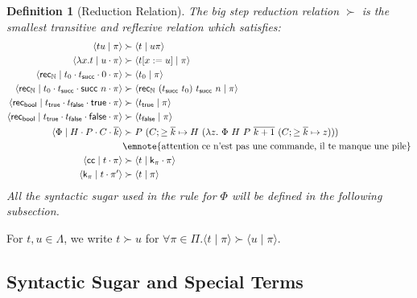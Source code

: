 \documentclass{article}
\newcommand{\successor}{\mathsf{succ}}
\newcommand{\recN}{\mathsf{rec}_{\mathbb{N}}}
\newcommand{\true}{\mathsf{true}}
\newcommand{\false}{\mathsf{false}}
\newcommand{\recbool}{\mathsf{rec_{bool}}}
\newcommand{\proc}[2]{\langle{#1}\mid{#2}\rangle}
\newcommand{\cc}{\mathsf{cc}}
\newcommand{\cont}{\mathsf{k}}
\newtheorem{definition}{Definition}
\begin{document}
\begin{definition}[Reduction Relation]
    The big step reduction relation $\succ$ is the smallest transitive and reflexive relation which satisfies:
    \begin{align*}
        \proc{t u}{\pi} & \succ \proc{t}{u\pi} \\
        \proc{\lambda x. t}{u\cdot \pi} & \succ \proc{t[x := u]}{\pi} \\
        \proc{\recN}{t_0 \cdot t_\successor \cdot 0 \cdot \pi} & \succ \proc{t_0}{\pi} \\
        \proc{\recN}{t_0 \cdot t_\successor \cdot \successor\ n \cdot \pi} & \succ \proc{\recN\ (t_\successor\ t_0)\ t_\successor\ n}{\pi} \\
        \proc{\recbool}{t_\true \cdot t_\false \cdot \true \cdot \pi} & \succ \proc{t_\true}{\pi} \\
        \proc{\recbool}{t_\true \cdot t_\false \cdot \false \cdot \pi} & \succ \proc{t_\false}{\pi} \\
        \proc{\Phi}{H \cdot P \cdot C \cdot \overline{k}} & \succ P\ (C; \ge \overline{k} \mapsto H\ (\lambda z.\ \Phi\ H\ P\ \overline{k+1}\ (C; \ge \overline{k} \mapsto z)))\\
        &\text{\emnote{attention ce n'est pas une commande, il te manque une pile}}\\
        \proc{\cc}{t \cdot \pi} & \succ \proc{t}{\cont_\pi \cdot \pi} \\
        \proc{\cont_\pi}{t \cdot \pi'} & \succ \proc{t}{\pi}
    \end{align*}
    All the syntactic sugar used in the rule for $\Phi$ will be defined in the following subsection.  
\end{definition}

For $t, u \in \Lambda$, we write $t \succ u$ for $\forall \pi \in \Pi. \proc{t}{\pi} \succ \proc{u}{\pi}$.

\subsection{Syntactic Sugar and Special Terms}
\end{document}
